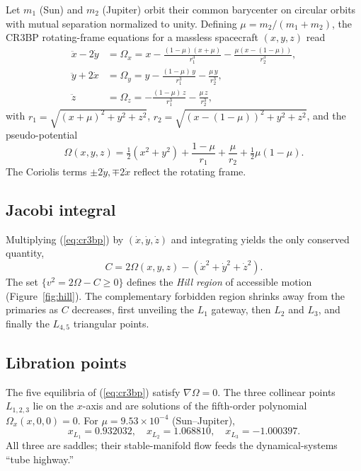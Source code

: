 \documentclass[11pt,a4paper]{article}
\begin{document}
Let $m_1$ (Sun) and $m_2$ (Jupiter) orbit their common barycenter on circular orbits with mutual separation normalized to unity. Defining $\mu = m_2/(m_1+m_2)$, the CR3BP rotating-frame equations for a massless spacecraft $(x,y,z)$ read
\begin{equation}
\label{eq:cr3bp}
\boxed{\;
\begin{aligned}
\ddot{x} - 2\dot{y} &= \Omega_x = x - \frac{(1-\mu)(x+\mu)}{r_1^3} - \frac{\mu(x-(1-\mu))}{r_2^3}, \\
\ddot{y} + 2\dot{x} &= \Omega_y = y - \frac{(1-\mu)\,y}{r_1^3} - \frac{\mu\,y}{r_2^3}, \\
\ddot{z}            &= \Omega_z = -\frac{(1-\mu)\,z}{r_1^3} - \frac{\mu\,z}{r_2^3},
\end{aligned}
\;}
\end{equation}
with $r_1 = \sqrt{(x+\mu)^2 + y^2 + z^2}$, $r_2 = \sqrt{(x-(1-\mu))^2 + y^2 + z^2}$, and the pseudo-potential
\begin{equation}
\Omega(x,y,z) = \tfrac{1}{2}(x^2 + y^2) + \frac{1-\mu}{r_1} + \frac{\mu}{r_2} + \tfrac{1}{2}\mu(1-\mu).
\end{equation}
The Coriolis terms $\pm 2\dot{y}, \mp 2\dot{x}$ reflect the rotating frame.

\subsection{Jacobi integral}
Multiplying (\ref{eq:cr3bp}) by $(\dot x, \dot y, \dot z)$ and integrating yields the only conserved quantity,
\begin{equation}
\label{eq:jacobi}
C = 2\Omega(x,y,z) - (\dot x^2 + \dot y^2 + \dot z^2).
\end{equation}
The set $\{v^2 = 2\Omega - C \ge 0\}$ defines the \emph{Hill region} of accessible motion (Figure~\ref{fig:hill}). The complementary forbidden region shrinks away from the primaries as $C$ decreases, first unveiling the $L_1$ gateway, then $L_2$ and $L_3$, and finally the $L_{4,5}$ triangular points.

\subsection{Libration points}
The five equilibria of (\ref{eq:cr3bp}) satisfy $\nabla \Omega = 0$. The three collinear points $L_{1,2,3}$ lie on the $x$-axis and are solutions of the fifth-order polynomial $\Omega_x(x,0,0) = 0$. For $\mu = 9.53\times 10^{-4}$ (Sun--Jupiter),
\begin{equation}
x_{L_1} = 0.932032, \quad x_{L_2} = 1.068810, \quad x_{L_3} = -1.000397.
\end{equation}
All three are saddles; their stable-manifold flow feeds the dynamical-systems ``tube highway.''
\end{document}
